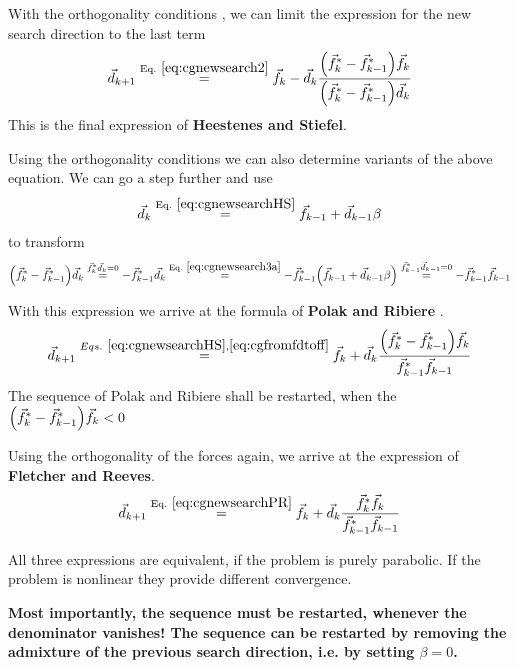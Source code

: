 \documentclass[11pt,a4paper]{report}
\begin{document}
With the orthogonality conditions , we
can limit the expression for the new search direction to the last term
\begin{eqnarray}
\vec{d}_{k+1}\eqrel{eq:cgnewsearch2}{=}\vec{f}_k
-\vec{d}_k
\frac{\Bigl(\vec{f}_k^*-\vec{f}_{k-1}^*\Bigr)\vec{f}_k}
{\Bigl(\vec{f}_k^*-\vec{f}_{k-1}^*\Bigr)\vec{d}_k}
\label{eq:cgnewsearchHS}
\end{eqnarray}
This is the final expression of
\textbf{Heestenes and Stiefel}.

Using the orthogonality conditions we can also determine variants of
the above equation.  We can go a step further and use
\begin{eqnarray}
\vec{d}_k\eqrel{eq:cgnewsearchHS}{=}\vec{f}_{k-1}+\vec{d}_{k-1}\beta
\label{eq:cgnewsearch3a}
\end{eqnarray}
to transform
\begin{eqnarray}
\Bigl(\vec{f}_k^*-\vec{f}_{k-1}^*\Bigr)\vec{d}_k
\stackrel{\vec{f}_k^*\vec{d}_k=0}{=}
-\vec{f}_{k-1}^*\vec{d}_k
\eqrel{eq:cgnewsearch3a}{=}
-\vec{f}_{k-1}^*\Bigl(\vec{f}_{k-1}+\vec{d}_{k-1}\beta\Bigr)
\stackrel{\vec{f}_{k-1}^*\vec{d}_{k-1}=0}{=}
-\vec{f}_{k-1}^*\vec{f}_{k-1}
\label{eq:cgfromfdtoff}
\end{eqnarray}

With this expression we arrive at the formula of \textbf{Polak and Ribiere}
.
\begin{eqnarray}
\vec{d}_{k+1}
\stackrel{Eqs.~\ref{eq:cgnewsearchHS},\ref{eq:cgfromfdtoff}}{=}
\vec{f}_k
+\vec{d}_k
\frac{\Bigl(\vec{f}_k^*-\vec{f}_{k-1}^*\Bigr)\vec{f}_k}
{\vec{f}_{k-1}^*\vec{f}_{k-1}}
\label{eq:cgnewsearchPR}
\end{eqnarray}
The sequence of Polak and Ribiere shall be restarted, when the 
$\Bigl(\vec{f}_k^*-\vec{f}_{k-1}^*\Bigr)\vec{f}_k<0$

Using the orthogonality of the forces again, we arrive at the expression of
\textbf{Fletcher and Reeves}.
\begin{eqnarray}
\vec{d}_{k+1}\eqrel{eq:cgnewsearchPR}{=}\vec{f}_k
+\vec{d}_k
\frac{\vec{f}_k^*\vec{f}_k}
{\vec{f}_{k-1}^*\vec{f}_{k-1}}
\label{eq:cgnewsearchFR}
\end{eqnarray}

All three expressions are equivalent, if the problem is purely
parabolic. If the problem is nonlinear they provide different
convergence.

\textbf{Most importantly, the sequence must be restarted, whenever the
  denominator vanishes! The sequence can be restarted by removing the
  admixture of the previous search direction, i.e. by setting
  $\beta=0$.}
\end{document}
